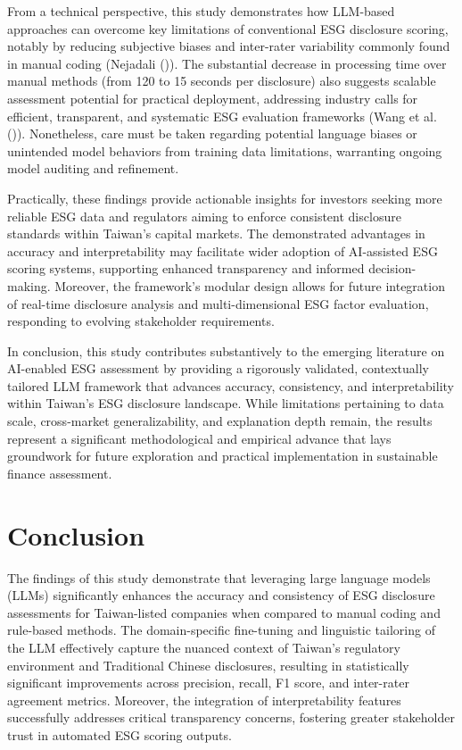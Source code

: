 \documentclass[
  12pt,
]{article}
\begin{document}
From a technical perspective, this study demonstrates how LLM-based
approaches can overcome key limitations of conventional ESG disclosure
scoring, notably by reducing subjective biases and inter-rater
variability commonly found in manual coding (Nejadali
()). The substantial decrease in
processing time over manual methods (from 120 to 15 seconds per
disclosure) also suggests scalable assessment potential for practical
deployment, addressing industry calls for efficient, transparent, and
systematic ESG evaluation frameworks (Wang et al.
()). Nonetheless, care must be taken
regarding potential language biases or unintended model behaviors from
training data limitations, warranting ongoing model auditing and
refinement.

Practically, these findings provide actionable insights for investors
seeking more reliable ESG data and regulators aiming to enforce
consistent disclosure standards within Taiwan's capital markets. The
demonstrated advantages in accuracy and interpretability may facilitate
wider adoption of AI-assisted ESG scoring systems, supporting enhanced
transparency and informed decision-making. Moreover, the framework's
modular design allows for future integration of real-time disclosure
analysis and multi-dimensional ESG factor evaluation, responding to
evolving stakeholder requirements.

In conclusion, this study contributes substantively to the emerging
literature on AI-enabled ESG assessment by providing a rigorously
validated, contextually tailored LLM framework that advances accuracy,
consistency, and interpretability within Taiwan's ESG disclosure
landscape. While limitations pertaining to data scale, cross-market
generalizability, and explanation depth remain, the results represent a
significant methodological and empirical advance that lays groundwork
for future exploration and practical implementation in sustainable
finance assessment.

\section{Conclusion}\label{conclusion}

The findings of this study demonstrate that leveraging large language
models (LLMs) significantly enhances the accuracy and consistency of ESG
disclosure assessments for Taiwan-listed companies when compared to
manual coding and rule-based methods. The domain-specific fine-tuning
and linguistic tailoring of the LLM effectively capture the nuanced
context of Taiwan's regulatory environment and Traditional Chinese
disclosures, resulting in statistically significant improvements across
precision, recall, F1 score, and inter-rater agreement metrics.
Moreover, the integration of interpretability features successfully
addresses critical transparency concerns, fostering greater stakeholder
trust in automated ESG scoring outputs.
\end{document}
